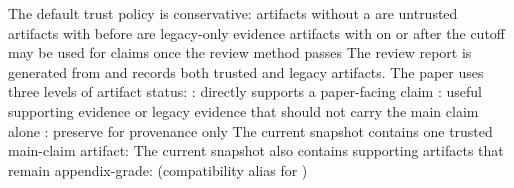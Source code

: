 {}\markdownRendererSectionBegin
{}\markdownRendererInterblockSeparator
{}The default trust policy is conservative:\markdownRendererInterblockSeparator
{}\markdownRendererUlBeginTight
\markdownRendererUlItem artifacts without a  are untrusted\markdownRendererUlItemEnd 
\markdownRendererUlItem artifacts with  before  are legacy-only evidence\markdownRendererUlItemEnd 
\markdownRendererUlItem artifacts with  on or after the cutoff may be used for claims once the review method passes\markdownRendererUlItemEnd 
\markdownRendererUlEndTight \markdownRendererInterblockSeparator
{}The review report is generated from  and records both trusted and legacy artifacts.\markdownRendererInterblockSeparator
{}
\markdownRendererSectionEnd \markdownRendererSectionBegin
{}\markdownRendererInterblockSeparator
{}The paper uses three levels of artifact status:\markdownRendererInterblockSeparator
{}\markdownRendererUlBeginTight
\markdownRendererUlItem {}: directly supports a paper-facing claim\markdownRendererUlItemEnd 
\markdownRendererUlItem {}: useful supporting evidence or legacy evidence that should not carry the main claim alone\markdownRendererUlItemEnd 
\markdownRendererUlItem {}: preserve for provenance only\markdownRendererUlItemEnd 
\markdownRendererUlEndTight \markdownRendererInterblockSeparator
{}The current snapshot contains one trusted main-claim artifact:\markdownRendererInterblockSeparator
{}\markdownRendererUlBeginTight
\markdownRendererUlItem {}\markdownRendererUlItemEnd 
\markdownRendererUlEndTight \markdownRendererInterblockSeparator
{}The current snapshot also contains supporting artifacts that remain appendix-grade:\markdownRendererInterblockSeparator
{}\markdownRendererUlBeginTight
\markdownRendererUlItem {}  (compatibility alias for )\markdownRendererUlItemEnd 
\markdownRendererUlItem {}\markdownRendererUlItemEnd 
